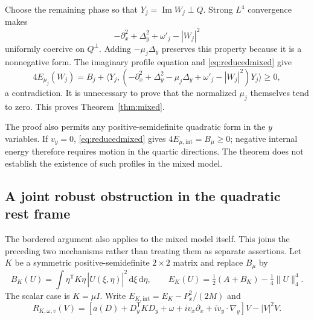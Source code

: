 \documentclass[11pt]{article}
\theoremstyle{definition}
\theoremstyle{remark}
\DeclareMathOperator{\Ima}{Im}
\newcommand{\ip}[2]{\langle #1,#2\rangle}
\newcommand{\norm}[1]{\lVert #1\rVert}
\newcommand{\dd}{\,\mathrm d}
\begin{document}
Choose the remaining phase so that $Y_j=\Ima W_j\perp Q$. Strong $L^4$ convergence makes
\[
 -\partial_x^2+\Delta_y^2+\omega'_j-|W_j|^2
\]
uniformly coercive on $Q^\perp$. Adding $-\mu_j\Delta_y$ preserves this property because it is a nonnegative form. The imaginary profile equation and \eqref{eq:reducedmixed} give
\[
 4E_{\mu_j}(W_j)=B_j+
 \ip{Y_j}{(-\partial_x^2+\Delta_y^2-\mu_j\Delta_y+
                   \omega'_j-|W_j|^2)Y_j}\ge0,
\]
a contradiction. It is unnecessary to prove that the normalized $\mu_j$ themselves tend to zero. This proves Theorem~\ref{thm:mixed}.

The proof also permits any positive-semidefinite quadratic form in the $y$ variables. If $v_y=0$, \eqref{eq:reducedmixed} gives $4E_{\mu,\mathrm{int}}=B_\mu\ge0$; negative internal energy therefore requires motion in the quartic directions. The theorem does not establish the existence of such profiles in the mixed model.

\subsection{A joint robust obstruction in the quadratic rest frame}

The bordered argument also applies to the mixed model itself. This joins the preceding two mechanisms rather than treating them as separate assertions. Let $K$ be a symmetric positive-semidefinite $2\times2$ matrix and replace $B_\mu$ by
\[
 B_K(U)=\int\eta^{\mathsf T}K\eta\,|\widehat U(\xi,\eta)|^2\dd\xi\dd\eta,
 \qquad E_K(U)=\tfrac12(A+B_K)-\tfrac14\norm U_4^4.
\]
The scalar case is $K=\mu I$. Write $E_{K,\mathrm{int}}=E_K-P_x^2/(2M)$ and
\[
 R_{K,\omega,v}(V)=
 [a(D)+D_y^{\mathsf T}KD_y+\omega+iv_x\partial_x
              +iv_y\cdot\nabla_y]V-|V|^2V.
\]
\end{document}
